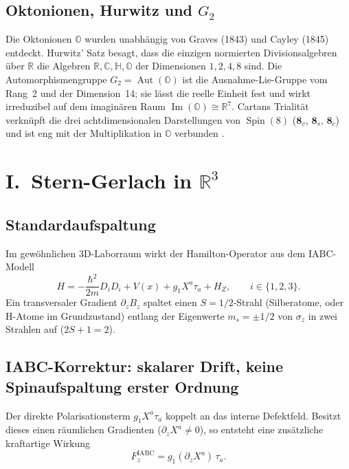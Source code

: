 \documentclass[11pt,a4paper]{article}
\theoremstyle{definition}
\theoremstyle{remark}
\newcommand{\ImO}{\operatorname{Im}}
\newcommand{\Spin}{\operatorname{Spin}}
\newcommand{\Aut}{\operatorname{Aut}}
\newcommand{\R}{\mathbb{R}}
\newcommand{\C}{\mathbb{C}}
\newcommand{\HH}{\mathbb{H}}
\newcommand{\OO}{\mathbb{O}}
\begin{document}
\subsection{Oktonionen, Hurwitz und \texorpdfstring{\(G_2\)}{G2}}

Die Oktonionen \(\OO\) wurden unabhängig von Graves (1843) und Cayley (1845) entdeckt.
Hurwitz' Satz besagt, dass die einzigen normierten Divisionsalgebren über \(\R\) die
Algebren \(\R,\C,\HH,\OO\) der Dimensionen \(1,2,4,8\) sind. Die Automorphismengruppe
\(G_2=\Aut(\OO)\) ist die Ausnahme-Lie-Gruppe vom Rang~2 und der Dimension~14; sie lässt
die reelle Einheit fest und wirkt irreduzibel auf dem imaginären Raum \(\ImO(\OO)\cong\R^7\).
Cartans Trialität verknüpft die drei achtdimensionalen Darstellungen von \(\Spin(8)\)
(\(\mathbf{8}_v\), \(\mathbf{8}_s\), \(\mathbf{8}_c\)) und ist eng mit der Multiplikation
in \(\OO\) verbunden \cite{Baez2002,Cartan1925}.

\section{I.\ Stern-Gerlach in \texorpdfstring{\(\R^3\)}{R\string^3}}

\subsection{Standardaufspaltung}

Im gewöhnlichen 3D-Laborraum wirkt der Hamilton-Operator aus dem IABC-Modell
\begin{equation}
  H=-\frac{\hbar^2}{2m}D_i D_i+V(x)+g_1 X^a\tau_a+H_Z,\qquad i\in\{1,2,3\}.
\end{equation}
Ein transversaler Gradient \(\partial_z B_z\) spaltet einen \(S=1/2\)-Strahl
(Silberatome, oder H-Atome im Grundzustand) entlang der Eigenwerte \(m_s=\pm 1/2\) von
\(\sigma_z\) in zwei Strahlen auf (\(2S+1=2\)).

\subsection{IABC-Korrektur: skalarer Drift, keine Spinaufspaltung erster Ordnung}

Der direkte Polarisationsterm \(g_1 X^a\tau_a\) koppelt an das interne Defektfeld. Besitzt
dieses einen räumlichen Gradienten (\(\partial_z X^a\neq 0\)), so entsteht eine zusätzliche
kraftartige Wirkung
\begin{equation}
  F_z^{\mathrm{IABC}}=g_1(\partial_z X^a)\,\tau_a.
  \label{eq:FzIABC}
\end{equation}
\end{document}
